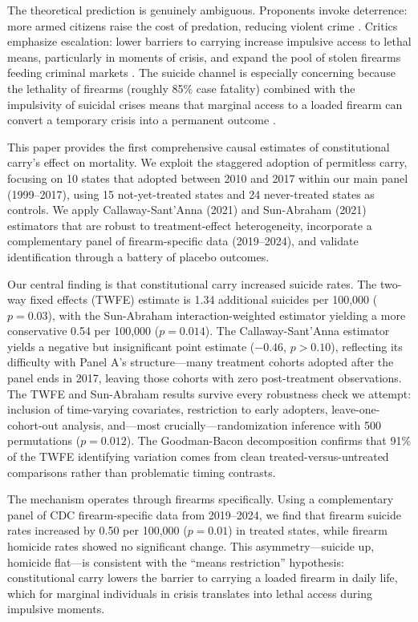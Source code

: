 \documentclass[12pt]{article}
\begin{document}
The theoretical prediction is genuinely ambiguous. Proponents invoke deterrence: more armed citizens raise the cost of predation, reducing violent crime \citep{lott1997more}. Critics emphasize escalation: lower barriers to carrying increase impulsive access to lethal means, particularly in moments of crisis, and expand the pool of stolen firearms feeding criminal markets \citep{donohue2019right}. The suicide channel is especially concerning because the lethality of firearms (roughly 85\% case fatality) combined with the impulsivity of suicidal crises means that marginal access to a loaded firearm can convert a temporary crisis into a permanent outcome \citep{miller2012firearms}.

This paper provides the first comprehensive causal estimates of constitutional carry's effect on mortality. We exploit the staggered adoption of permitless carry, focusing on 10 states that adopted between 2010 and 2017 within our main panel (1999--2017), using 15 not-yet-treated states and 24 never-treated states as controls. We apply Callaway-Sant'Anna (2021) and Sun-Abraham (2021) estimators that are robust to treatment-effect heterogeneity, incorporate a complementary panel of firearm-specific data (2019--2024), and validate identification through a battery of placebo outcomes.

Our central finding is that constitutional carry increased suicide rates. The two-way fixed effects (TWFE) estimate is 1.34 additional suicides per 100,000 ($p = 0.03$), with the Sun-Abraham interaction-weighted estimator yielding a more conservative 0.54 per 100,000 ($p = 0.014$). The Callaway-Sant'Anna estimator yields a negative but insignificant point estimate ($-0.46$, $p > 0.10$), reflecting its difficulty with Panel A's structure---many treatment cohorts adopted after the panel ends in 2017, leaving those cohorts with zero post-treatment observations. The TWFE and Sun-Abraham results survive every robustness check we attempt: inclusion of time-varying covariates, restriction to early adopters, leave-one-cohort-out analysis, and---most crucially---randomization inference with 500 permutations ($p = 0.012$). The Goodman-Bacon decomposition confirms that 91\% of the TWFE identifying variation comes from clean treated-versus-untreated comparisons rather than problematic timing contrasts.

The mechanism operates through firearms specifically. Using a complementary panel of CDC firearm-specific data from 2019--2024, we find that firearm suicide rates increased by 0.50 per 100,000 ($p = 0.01$) in treated states, while firearm homicide rates showed no significant change. This asymmetry---suicide up, homicide flat---is consistent with the ``means restriction'' hypothesis: constitutional carry lowers the barrier to carrying a loaded firearm in daily life, which for marginal individuals in crisis translates into lethal access during impulsive moments.
\end{document}
